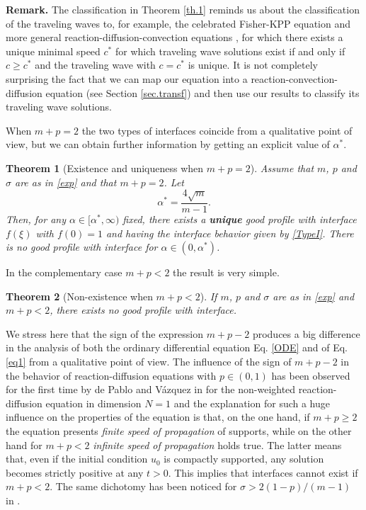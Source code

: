 \documentclass[a4paper,11pt]{article}
\newtheorem{theorem}{Theorem}[section]
\numberwithin{equation}{section}
\begin{document}
\medskip 

\noindent \textbf{Remark.} The classification in Theorem \ref{th.1} reminds us about the classification of the traveling waves to, for example, the celebrated Fisher-KPP equation and more general reaction-diffusion-convection equations \cite{GiBook}, for which there exists a unique minimal speed $c^*$ for which traveling wave solutions exist if and only if $c\geq c^*$ and the traveling wave with $c=c^*$ is unique. It is not completely surprising the fact that we can map our equation into a reaction-convection-diffusion equation (see Section \ref{sec.transf}) and then use our results to classify its traveling wave solutions.

\medskip

When $m+p=2$ the two types of interfaces coincide from a qualitative point of view, but we can obtain further information by getting an explicit value of $\alpha^*$.
\begin{theorem}[Existence and uniqueness when $m+p=2$]\label{th.1bis}
Assume that $m$, $p$ and $\sigma$ are as in \eqref{exp} and that $m+p=2$. Let
\begin{equation}\label{alpha.equal}
\alpha^*=\frac{4\sqrt{m}}{m-1}.
\end{equation}
Then, for any $\alpha\in[\alpha^*,\infty)$ fixed, there exists a \textbf{unique} good profile with interface $f(\xi)$ with $f(0)=1$ and having the interface behavior given by \eqref{TypeI}. There is no good profile with interface for $\alpha\in(0,\alpha^*)$.
\end{theorem}
In the complementary case $m+p<2$ the result is very simple.
\begin{theorem}[Non-existence when $m+p<2$]\label{th.2}
If $m$, $p$ and $\sigma$ are as in \eqref{exp} and $m+p<2$, there exists no good profile with interface.
\end{theorem}
We stress here that the sign of the expression $m+p-2$ produces a big difference in the analysis of both the ordinary differential equation Eq. \eqref{ODE} and of Eq. \eqref{eq1} from a qualitative point of view. The influence of the sign of $m+p-2$ in the behavior of reaction-diffusion equations with $p\in(0,1)$ has been observed for the first time by de Pablo and V\'azquez in \cite{dPV90} for the non-weighted reaction-diffusion equation in dimension $N=1$ and the explanation for such a huge influence on the properties of the equation is that, on the one hand, if $m+p\geq2$ the equation presents \emph{finite speed of propagation} of supports, while on the other hand for $m+p<2$ \emph{infinite speed of propagation} holds true. The latter means that, even if the initial condition $u_0$ is compactly supported, any solution becomes strictly positive at any $t>0$. This implies that interfaces cannot exist if $m+p<2$. The same dichotomy has been noticed for $\sigma>2(1-p)/(m-1)$ in \cite{IS20b}.
\end{document}

